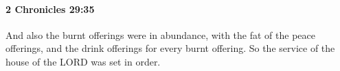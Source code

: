 
		\paragraph{2 Chronicles 29:35} %
			\label{2CHRONICLES-29-35}

			And also the burnt offerings were in abundance, with the fat of the peace offerings, and the drink offerings for every burnt offering. So the service of the house of the LORD was set in order.


